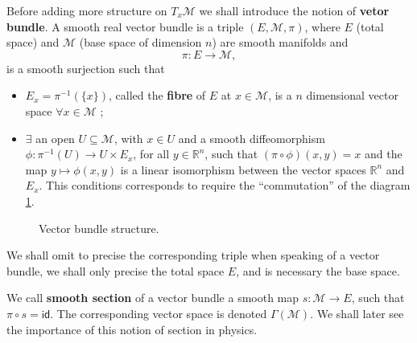 \documentclass[10pt]{book}
\newcommand{\id}{\mathsf{id}}
\newcommand{\Mcal}{\mathcal{M}}
\newcommand{\Rbb}{\mathbb{R}}
\theoremstyle{break}
\begin{document}
Before adding more structure on $T_x \Mcal$ we shall introduce the notion of \textbf{vetor bundle}. A smooth real vector bundle is a triple $(E,\Mcal,\pi)$, where $E$ (total space) and $\Mcal$ (base space of dimension $n$) are smooth manifolds and 
%
\begin{equation*}
\pi : E \to \Mcal , 
\end{equation*}
%
is a smooth surjection such that
%
\begin{itemize}
\item $E_x = \pi^{-1}(\{x\})$, called the \textbf{fibre} of $E$ at $x\in\Mcal$, is a $n$ dimensional vector space $\forall x \in \Mcal$ ; 
\item $\exists$ an open $U \subseteq \Mcal$, with $x \in U$ and a smooth diffeomorphism $\phi : \pi^{-1}(U) \to U \times E_x$, for all $y \in \Rbb^n$, such that $(\pi \circ \phi)(x,y) = x$ and the map $y \mapsto \phi(x,y)$ is a linear isomorphism between the vector spaces $\Rbb^n$ and $E_x$. This conditions corresponds to require the ``commutation'' of the diagram \ref{fig:vect-bund-strut}.
\end{itemize}


\begin{figure}[h!]
\begin{center}
\end{center}
\caption{Vector bundle structure.}
\label{fig:vect-bund-strut}
\end{figure}


We shall omit to precise the corresponding triple when speaking of a vector bundle, we shall only precise the total space $E$, and is necessary the base space.


\bigskip


We call \textbf{smooth section} of a vector bundle a smooth map $s : \Mcal \to E$, such that $\pi \circ s = \id$. The corresponding vector space is denoted $\Gamma(\Mcal)$. We shall later see the importance of this notion of section in physics.


\bigskip
\end{document}
